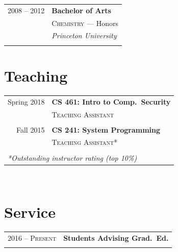 \documentclass[10pt]{article} %
\begin{document}
{\begin{minipage}[t]{0.44\textwidth}
\begin{tabular}{rl}

2008 -- 2012 & \textbf{Bachelor of Arts} \\ 
& \textsc{Chemistry} --- \small{Honors} \\ 
& \textit{Princeton University}\\
&\\
	  
\end{tabular}


\section{Teaching} 

\begin{tabular}{rl}

Spring 2018	 & \textbf{CS 461: Intro to Comp.\ Security}\\
& \textsc{Teaching Assistant}\\ \\
 

Fall 2015	 & \textbf{CS 241: System Programming}\\
& \textsc{Teaching Assistant*}\\ \\



\multicolumn{2}{l}{\textit{*Outstanding instructor rating (top 10\%)}}
\end{tabular}\\[10pt]


\section{Service} 

\begin{tabular}{rl}
2016 -- \textsc{Present} & \textbf{Students Advising Grad.\ Ed.}\\
& \\


\end{tabular}
\end{minipage}}
\end{document}
